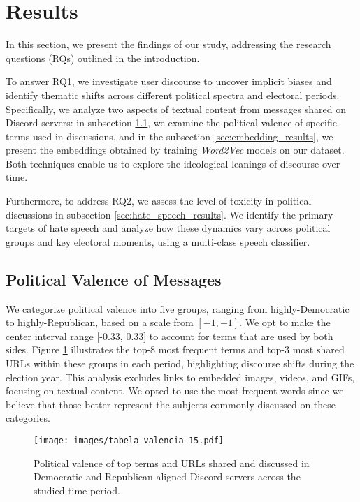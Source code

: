 \section{Results}
In this section, we present the findings of our study, addressing the research questions (RQs) outlined in the introduction.

To answer RQ1, we investigate user discourse to uncover implicit biases and identify thematic shifts across different political spectra and electoral periods. Specifically, we analyze two aspects of textual content from messages shared on Discord servers: in subsection \ref{sec:valence}, we examine the political valence of specific terms used in discussions, and in the subsection \ref{sec:embedding_results}, we present the embeddings obtained by training \textit{Word2Vec} models on our dataset. Both techniques enable us to explore the ideological leanings of discourse over time.

Furthermore, to address RQ2, we assess the level of toxicity in political discussions in subsection \ref{sec:hate_speech_results}. We identify the primary targets of hate speech and analyze how these dynamics vary across political groups and key electoral moments, using a multi-class speech classifier.

\subsection{Political Valence of Messages}
\label{sec:valence}
We categorize political valence into five groups, ranging from highly-Democratic to highly-Republican, based on a scale from \( [-1, +1] \).  We opt to make the center interval range [-0.33, 0.33] to account for terms that are used by both sides. Figure \ref{fig:valenceT1} illustrates the top-8 most frequent terms and top-3 most shared URLs within these groups in each period, highlighting discourse shifts during the election year. This analysis excludes links to embedded images, videos, and GIFs, focusing on textual content. We opted to use the most frequent words since we believe that those better represent the subjects commonly discussed on these categories.

\begin{figure}[h]
    \centering
    \texttt{[image: images/tabela-valencia-15.pdf]}
    \caption{Political valence of top terms and URLs shared and discussed in Democratic and Republican-aligned Discord servers across the studied time period. }
    \label{fig:valenceT1}
\end{figure}

